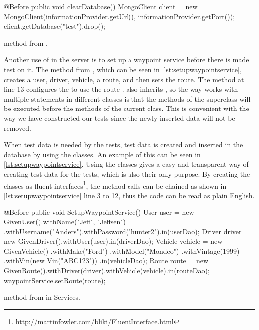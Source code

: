 \begin{listing}
    \begin{java2}
        @Before
        public void clearDatabase() {
            MongoClient client = new MongoClient(informationProvider.getUrl(), informationProvider.getPort());
            client.getDatabase("test").drop();
        }
    \end{java2}
    \caption{ method from .}
    \label{lst:cleardatabase}
\end{listing}

Another use of  in the server is to set up a waypoint service before there is made test on it.
The method  from , 
which can be seen in \cref{lst:setupwaypointservice},
creates a user, driver, vehicle, a route, and then sets the route.
The  method at line 13 configures the  to use the route .
 also inherits , 
so the way  works with multiple  statements in different classes 
is that the  methods of the superclass will be executed before the  methods of the current class\cite{before_doc}.
This is convenient with the way we have constructed our tests since the newly inserted data will not be removed. 

\bigskip

When test data is needed by the tests, test data is created and inserted in the database by using the  classes.
An example of this can be seen in \cref{lst:setupwaypointservice}.
Using the  classes gives a easy and transparent way of creating test data for the tests, which is also their only purpose.
By creating the  classes as fluent interfaces\footnote{\url{http://martinfowler.com/bliki/FluentInterface.html}}, the method calls can be chained as shown in \cref{lst:setupwaypointservice} line 3 to 12,
thus the code can be read as plain English.

\begin{listing}
    \begin{java2}
        @Before
        public void SetupWaypointService() {
            User user = new GivenUser().withName("Jeff", "Jeffsen")
                .withUsername("Anders").withPassword("hunter2").in(userDao);
            Driver driver = new GivenDriver().withUser(user).in(driverDao);
            Vehicle vehicle = new GivenVehicle()
                .withMake("Ford")
                .withModel("Mondeo")
                .withVintage(1999)
                .withVin(new Vin("ABC123"))
                .in(vehicleDao);
            Route route = new GivenRoute().withDriver(driver).withVehicle(vehicle).in(routeDao);
            waypointService.setRoute(route);
        }        
    \end{java2}
    \caption{ method from  in Services.}
    \label{lst:setupwaypointservice}
\end{listing}

